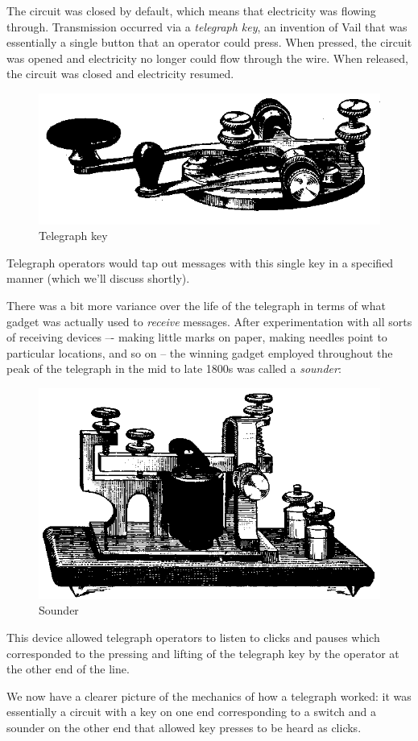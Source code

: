 \documentclass[UTF8]{book}
\begin{document}
\begin{CJK}{UTF8}{gbsn}
The circuit was closed by default, which means that electricity was flowing through. Transmission occurred via a \emph{telegraph key}, an invention of Vail that was essentially a single button that an operator could press. When pressed, the circuit was opened and electricity no longer could flow through the wire. When released, the circuit was closed and electricity resumed.

\begin{figure}[H]
\centering
\includegraphics[width=0.6\linewidth]{telegraphkey}
\caption{Telegraph key}
\end{figure}

Telegraph operators would tap out messages with this single key in a specified manner (which we'll discuss shortly).

There was a bit more variance over the life of the telegraph in terms of what gadget was actually used to \emph{receive} messages. After experimentation with all sorts of receiving devices –- making little marks on paper, making needles point to particular locations, and so on -- the winning gadget employed throughout the peak of the telegraph in the mid to late 1800s was called a \emph{sounder}:

\begin{figure}[H]
\centering
\includegraphics[width=0.6\linewidth]{telegraphsounder}
\caption{Sounder}
\end{figure}


This device allowed telegraph operators to listen to clicks and pauses which corresponded to the pressing and lifting of the telegraph key by the operator at the other end of the line.

We now have a clearer picture of the mechanics of how a telegraph worked: it was essentially a circuit with a key on one end corresponding to a switch and a sounder on the other end that allowed key presses to be heard as clicks.


\end{CJK}
\end{document}
